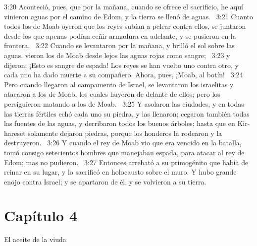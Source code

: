 3:20 Aconteció, pues, que por la mañana, cuando se ofrece el sacrificio, he aquí vinieron aguas por el camino de Edom, y la tierra se llenó de aguas.  
3:21 Cuanto todos los de Moab oyeron que los reyes subían a pelear contra ellos, se juntaron desde los que apenas podían ceñir armadura en adelante, y se pusieron en la frontera.  
3:22 Cuando se levantaron por la mañana, y brilló el sol sobre las aguas, vieron los de Moab desde lejos las aguas rojas como sangre;  
3:23 y dijeron: ¡Esto es sangre de espada! Los reyes se han vuelto uno contra otro, y cada uno ha dado muerte a su compañero. Ahora, pues, ¡Moab, al botín!  
3:24 Pero cuando llegaron al campamento de Israel, se levantaron los israelitas y atacaron a los de Moab, los cuales huyeron de delante de ellos; pero los persiguieron matando a los de Moab.  
3:25 Y asolaron las ciudades, y en todas las tierras fértiles echó cada uno su piedra, y las llenaron; cegaron también todas las fuentes de las aguas, y derribaron todos los buenos árboles; hasta que en Kir-hareset solamente dejaron piedras, porque los honderos la rodearon y la destruyeron.  
3:26 Y cuando el rey de Moab vio que era vencido en la batalla, tomó consigo setecientos hombres que manejaban espada, para atacar al rey de Edom; mas no pudieron.  
3:27 Entonces arrebató a su primogénito que había de reinar en su lugar, y lo sacrificó en holocausto sobre el muro. Y hubo grande enojo contra Israel; y se apartaron de él, y se volvieron a su tierra.  
\section*{Capítulo 4 }
El aceite de la viuda  

